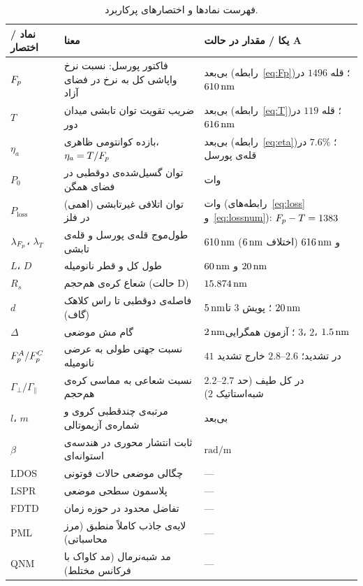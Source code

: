 \begin{table}[htbp]
  \centering
  \caption{فهرست نمادها و اختصارهای پرکاربرد.}
  \label{tab:nomenclature}
  \begin{tabular}{lll}
    \toprule
    نماد / اختصار & معنا & یکا / مقدار در حالت A \\
    \midrule
    $F_p$ & فاکتور پورسل: نسبت نرخ واپاشی کل به نرخ در فضای آزاد
          & بی‌بعد (رابطه~\eqref{eq:Fp})؛ قله $1496$ در $610\,\text{nm}$ \\
    $T$ & ضریب تقویت توان تابشی میدان دور
          & بی‌بعد (رابطه~\eqref{eq:T})؛ قله $119$ در $616\,\text{nm}$ \\
    $\eta_a$ & بازده کوانتومی ظاهری، $\eta_a = T/F_p$
          & بی‌بعد (رابطه~\eqref{eq:eta})؛ $7.6\%$ در قله‌ی پورسل \\
    $P_0$ & توان گسیل‌شده‌ی دوقطبی در فضای همگن & وات \\
    $P_{\text{loss}}$ & توان اتلافی غیرتابشی (اهمی) در فلز
          & وات (رابطه‌های~\eqref{eq:loss} و~\eqref{eq:lossnum}):
            $F_p - T = 1383$ \\
    $\lambda_{F_p}$، $\lambda_{T}$ & طول‌موج قله‌ی پورسل و قله‌ی تابشی
          & $610\,\text{nm}$ و $616\,\text{nm}$ (اختلاف $6\,\text{nm}$) \\
    $L$، $D$ & طول کل و قطر نانومیله & $60\,\text{nm}$ و $20\,\text{nm}$ \\
    $R_s$ & شعاع کره‌ی هم‌حجم (حالت D) & $15.874\,\text{nm}$ \\
    $d$ & فاصله‌ی دوقطبی تا راس کلاهک (گاف) & $5\,\text{nm}$؛ پویش $3$ تا $20\,\text{nm}$ \\
    $\Delta$ & گام مش موضعی & $2\,\text{nm}$؛ آزمون همگرایی $3$، $2$، $1.5\,\text{nm}$ \\
    $F_p^{A}/F_p^{C}$ & نسبت جهتی طولی به عرضی نانومیله
          & $41$ در تشدید؛ $2.6$--$2.8$ خارج تشدید \\
    $\Gamma_\perp/\Gamma_\parallel$ & نسبت شعاعی به مماسی کره‌ی هم‌حجم
          & $2.2$--$2.7$ در کل طیف (حد شبه‌استاتیک $2$) \\
    $l$، $m$ & مرتبه‌ی چندقطبی کروی و شماره‌ی آزیموتالی & بی‌بعد \\
    $\beta$ & ثابت انتشار محوری در هندسه‌ی استوانه‌ای & $\text{rad/m}$ \\
    \midrule
    LDOS & چگالی موضعی حالات فوتونی & --- \\
    LSPR & پلاسمون سطحی موضعی & --- \\
    FDTD & تفاضل محدود در حوزه زمان & --- \\
    PML & لایه‌ی جاذب کاملاً منطبق (مرز محاسباتی) & --- \\
    QNM & مد شبه‌نرمال (مد کاواک با فرکانس مختلط) & --- \\
    \bottomrule
  \end{tabular}
\end{table}
